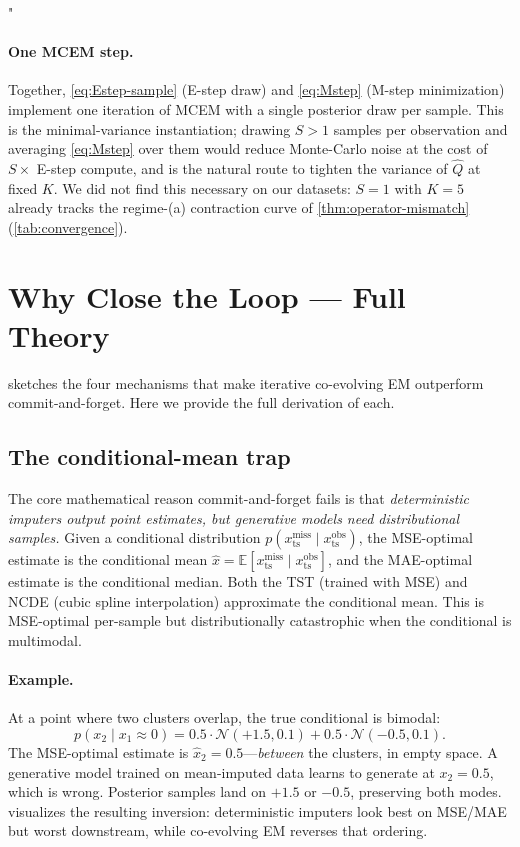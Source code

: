 "\documentclass{article}
\theoremstyle{plain}
\theoremstyle{definition}
\theoremstyle{remark}
\newcommand{\xts}{x_{\mathrm{ts}}}
\begin{document}
\paragraph{One MCEM step.}
Together, \cref{eq:Estep-sample} (E-step draw) and \cref{eq:Mstep} (M-step minimization) implement one iteration of MCEM with a single posterior draw per sample. This is the minimal-variance instantiation; drawing $S > 1$ samples per observation and averaging \cref{eq:Mstep} over them would reduce Monte-Carlo noise at the cost of $S\times$ E-step compute, and is the natural route to tighten the variance of $\hat{Q}$ at fixed $K$. We did not find this necessary on our datasets: $S = 1$ with $K = 5$ already tracks the regime-(a) contraction curve of \cref{thm:operator-mismatch} (\cref{tab:convergence}).

\section{Why Close the Loop --- Full Theory}
\label{app:why-close-full}

 sketches the four mechanisms that make iterative co-evolving EM outperform commit-and-forget. Here we provide the full derivation of each.

\subsection{The conditional-mean trap}
\label{app:cond-mean-trap}

The core mathematical reason commit-and-forget fails is that \emph{deterministic imputers output point estimates, but generative models need distributional samples.} Given a conditional distribution $p(\xts^{\mathrm{miss}} \mid \xts^{\mathrm{obs}})$, the MSE-optimal estimate is the conditional mean $\hat{x} = \mathbb{E}[\xts^{\mathrm{miss}} \mid \xts^{\mathrm{obs}}]$, and the MAE-optimal estimate is the conditional median. Both the TST (trained with MSE) and NCDE (cubic spline interpolation) approximate the conditional mean. This is MSE-optimal per-sample but distributionally catastrophic when the conditional is multimodal.

\paragraph{Example.}
At a point where two clusters overlap, the true conditional is bimodal:
$$
p(x_2 \mid x_1 \approx 0) = 0.5 \cdot \mathcal{N}(+1.5, 0.1) + 0.5 \cdot \mathcal{N}(-0.5, 0.1).
$$
The MSE-optimal estimate is $\hat{x}_2 = 0.5$---\emph{between} the clusters, in empty space. A generative model trained on mean-imputed data learns to generate at $x_2 = 0.5$, which is wrong. Posterior samples land on $+1.5$ or $-0.5$, preserving both modes.  visualizes the resulting inversion: deterministic imputers look best on MSE/MAE but worst downstream, while co-evolving EM reverses that ordering.
\end{document}
